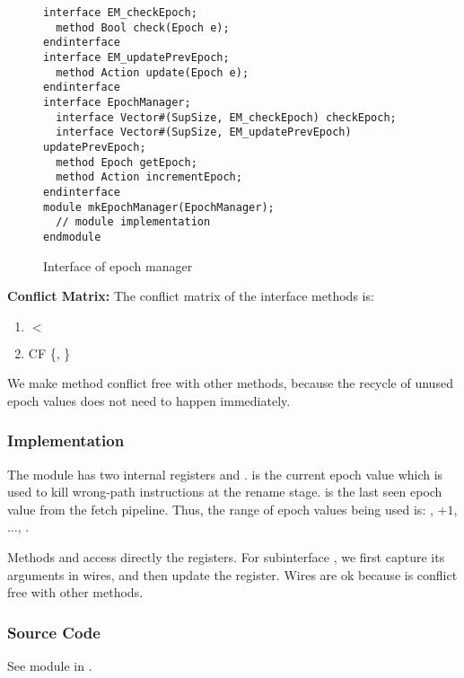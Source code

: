 \begin{figure}
\begin{lstlisting}[caption={}]
interface EM_checkEpoch;
  method Bool check(Epoch e);
endinterface
interface EM_updatePrevEpoch;
  method Action update(Epoch e);
endinterface
interface EpochManager;
  interface Vector#(SupSize, EM_checkEpoch) checkEpoch;
  interface Vector#(SupSize, EM_updatePrevEpoch) updatePrevEpoch;
  method Epoch getEpoch;
  method Action incrementEpoch;
endinterface
module mkEpochManager(EpochManager);
  // module implementation
endmodule
\end{lstlisting}
\caption{Interface of epoch manager}\label{fig:epoch-ifc}
\end{figure}

\noindent\textbf{Conflict Matrix:}
The conflict matrix of the interface methods is:
\begin{enumerate}
    \item {} $<$ 
    \item {} CF \{, \}
\end{enumerate}
We make method  conflict free with other methods, because the recycle of unused epoch values does not need to happen immediately.

\subsubsection{Implementation}
The module has two internal registers  and .
 is the current epoch value which is used to kill wrong-path instructions at the rename stage.
 is the last seen epoch value from the fetch pipeline.
Thus, the range of epoch values being used is: , $+1$, $\ldots$, .

Methods  and  access directly the registers.
For subinterface , we first capture its arguments in wires, and then update the  register.
Wires are ok because  is conflict free with other methods.

\subsubsection{Source Code}
See module  in .        
